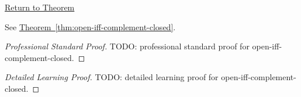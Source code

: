 \newpage
{}
\label{prf:open-iff-complement-closed}

\begin{remark*}[Return]
\hyperref[thm:open-iff-complement-closed]{Return to Theorem}
\end{remark*}

\begin{theorem*}
See \hyperref[thm:open-iff-complement-closed]{Theorem~\ref*{thm:open-iff-complement-closed}}.
\end{theorem*}

\begin{proof}[Professional Standard Proof]
\LRAProofBodyStart
TODO: professional standard proof for open-iff-complement-closed.
\end{proof}

\begin{proof}[Detailed Learning Proof]
\LRAProofBodyStart
TODO: detailed learning proof for open-iff-complement-closed.
\end{proof}

\begin{remark*}
\end{remark*}

\begin{dependencies}
\NoLocalDependencies
\end{dependencies}

\clearpage
